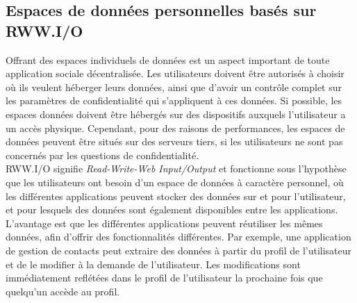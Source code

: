 \subsection*{Espaces de données personnelles basés sur RWW.I/O}
Offrant des espaces individuels de données est un aspect important de toute application sociale décentralisée. Les utilisateurs doivent être autorisés à choisir où ils veulent héberger leurs données, ainsi que d'avoir un contrôle complet sur les paramètres de confidentialité qui s'appliquent à ces données. Si possible, les espaces données doivent être hébergés sur des dispositifs auxquels l'utilisateur a un accès physique. Cependant, pour des raisons de performances, les espaces de données peuvent être situés sur des serveurs tiers, si les utilisateurs ne sont pas concernés par les questions de confidentialité.\\


RWW.I/O signifie \textit{Read-Write-Web Input/Output} et fonctionne sous l'hypothèse que les utilisateurs ont besoin d'un espace de données à caractère personnel, où les différentes applications peuvent stocker des données sur et pour l'utilisateur, et pour lesquels des données sont également disponibles entre les applications. L'avantage est que les différentes applications peuvent réutiliser les mêmes données, afin d'offrir des fonctionnalités différentes. Par exemple, une application de gestion de contacts peut extraire des données à partir du profil de l'utilisateur et de le modifier à la demande de l'utilisateur. Les modifications sont immédiatement reflétées dans le profil de l'utilisateur la prochaine fois que quelqu'un accède au profil.\\


